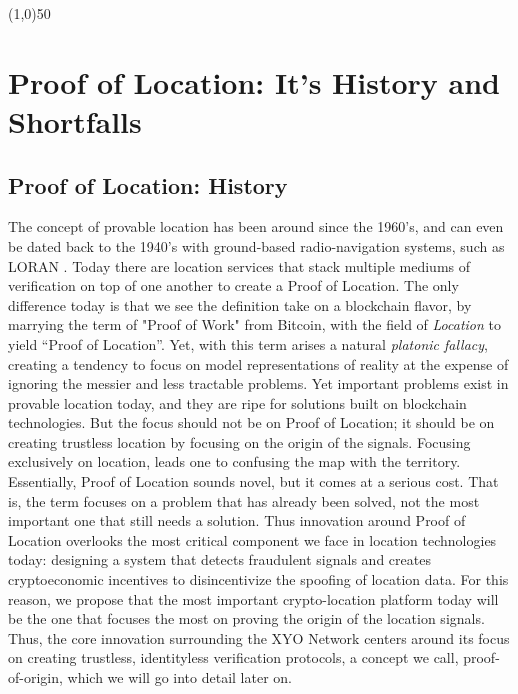 \documentclass{article}
\begin{document}
\begin{center}
\line(1,0){50}
\end{center}


\section{Proof of Location: It's History and Shortfalls}

\subsection {Proof of Location: History}
The concept of provable location has been around since the 1960's, and can even be dated back to the 1940's with ground-based radio-navigation systems, such as LORAN \cite{blanchard-loran}. Today there are location services that stack multiple mediums of verification on top of one another to create a Proof of Location. The only difference today is that we see the definition take on a  blockchain flavor, by marrying the term of "Proof of Work" from Bitcoin, with the field of \textit{Location} to yield ``Proof of Location''. Yet, with this term arises a natural \textit{platonic fallacy}, creating a tendency to focus on model representations of reality at the expense of ignoring the messier and less tractable problems. Yet important problems exist in provable location today, and they are ripe for solutions built on blockchain technologies. But the focus should not be on Proof of Location; it should be on creating trustless location by focusing on the origin of the signals. Focusing exclusively on location, leads one to confusing the map with the territory. Essentially, Proof of Location sounds novel, but it comes at a serious cost. That is, the term focuses on a problem that has already been solved, not the most important one that still needs a solution. Thus innovation around Proof of Location overlooks the most critical component we face in location technologies today: designing a system that detects fraudulent signals and creates cryptoeconomic incentives to disincentivize the spoofing of location data. For this reason, we propose that the most important crypto-location platform today will be the one that focuses the most on proving the origin of the location signals. Thus, the core innovation surrounding the XYO Network centers around its focus on creating trustless, identityless verification protocols, a concept we call, \Gls{proof-of-origin}, which we will go into detail later on.
\end{document}
